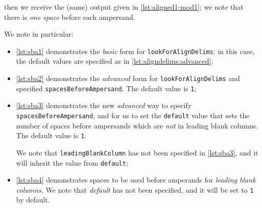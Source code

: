 \begin{example}
 then we receive the (same) output given in \cref{lst:aligned1-mod1}; we note that there
 is \emph{one space} before each ampersand.

 \begin{cmhtcbraster}
 \end{cmhtcbraster}

 We note in particular:
 \begin{itemize}
  \item \cref{lst:sba1} demonstrates the \emph{basic} form for
        \texttt{lookForAlignDelims}; in this case,
        the default values are specified as in \vref{lst:aligndelims:advanced};
  \item \cref{lst:sba2} demonstrates the \emph{advanced} form for
        \texttt{lookForAlignDelims}
        and specified \texttt{spacesBeforeAmpersand}. The default value is \texttt{1};
  \item \cref{lst:sba3} demonstrates the new \emph{advanced} way to specify
        \texttt{spacesBeforeAmpersand}, and
        for us to set the \texttt{default} value that sets the number of spaces before ampersands
        which are \emph{not} in leading blank columns. The default value is \texttt{1}.

        We note that \texttt{leadingBlankColumn} has not been specified in \cref{lst:sba3}, and
        it will inherit the value from \texttt{default};
  \item \cref{lst:sba4} demonstrates spaces to be used before amperands for
        \emph{leading blank columns}.
        We note that \emph{default} has not been specified, and it will be set to \texttt{1} by
        default.
 \end{itemize}
 \end{example}


